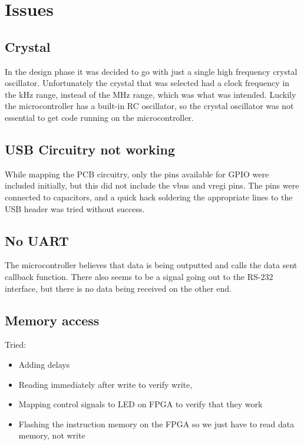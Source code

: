 \section{Issues}
\subsection{Crystal}
In the design phase it was decided to go with just a single high frequency crystal oscillator.
Unfortunately the crystal that was selected had a clock frequency in the kHz range, instead of the MHz range, which was what was intended.
Luckily the microcontroller has a built-in RC oscillator, so the crystal oscillator was not essential to get code running on the microcontroller.

\subsection{USB Circuitry not working}
While mapping the PCB circuitry, only the pins available for GPIO were included initially, but this did not include the vbus and vregi pins.
The pins were connected to capacitors, and a quick hack soldering the appropriate lines to the USB header was tried without success.

\subsection{No UART}
The microcontroller believes that data is being outputted and calls the data sent callback function.
There also seems to be a signal going out to the RS-232 interface, but there is no data being received on the other end.


\subsection{Memory access}
Tried:
\begin{itemize}
    \item Adding delays
    \item Reading immediately after write to verify write,
    \item Mapping control signals to LED on FPGA to verify that they work
    \item Flashing the instruction memory on the FPGA so we just have to read data memory, not write
\end{itemize}
